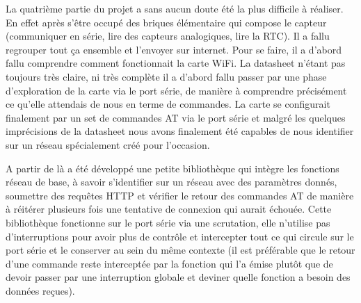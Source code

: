 		\par
		La quatrième partie du projet a sans aucun doute été la plus difficile à réaliser. En
		effet après s'être occupé des briques élémentaire qui compose le capteur (communiquer
		en série, lire des capteurs analogiques, lire la RTC). Il a fallu regrouper tout ça
		ensemble et l'envoyer sur internet. Pour se faire, il a d'abord fallu comprendre comment
		fonctionnait la carte WiFi. La datasheet n'étant pas toujours très claire, ni très complète
		il a d'abord fallu passer par une phase \og{} d'exploration \fg{} de la carte via le port
		série, de manière à comprendre précisément ce qu'elle attendais de nous en terme de commandes.
		La carte se configurait finalement par un set de commandes AT via le port série et malgré
		les quelques imprécisions de la datasheet nous avons finalement été capables de nous identifier
		sur un réseau spécialement créé pour l'occasion.
		
		\par
		A partir de là a été développé une petite bibliothèque qui intègre les fonctions réseau de base,
		à savoir s'identifier sur un réseau avec des paramètres donnés, soumettre des requêtes HTTP et
		vérifier le retour des commandes AT de manière à réitérer plusieurs fois une tentative de connexion
		qui aurait échouée. Cette bibliothèque fonctionne sur le port série via une scrutation, elle n'utilise
		pas d'interruptions pour avoir plus de contrôle et intercepter tout ce qui circule sur le port série
		et le conserver au sein du même contexte (il est préférable que le retour d'une commande reste interceptée
		par la fonction qui l'a émise plutôt que de devoir passer par une interruption globale et deviner
		quelle fonction a besoin des données reçues).
		
